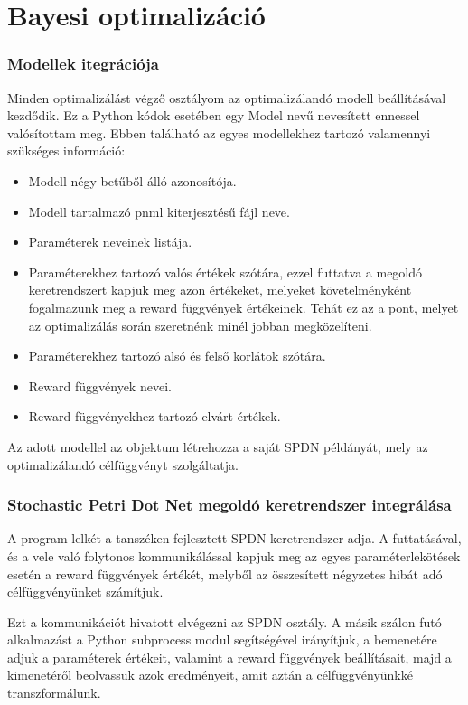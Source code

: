 \section{Bayesi optimalizáció}

\subsubsection{Modellek itegrációja}
Minden optimalizálást végző osztályom az optimalizálandó modell beállításával kezdődik. Ez a Python kódok esetében egy Model nevű nevesített ennessel valósítottam meg. %
Ebben található az egyes modellekhez tartozó valamennyi szükséges információ:
\begin{itemize}
	\item Modell négy betűből álló azonosítója.
	\item Modell tartalmazó pnml kiterjesztésű fájl neve.
	\item Paraméterek neveinek listája.
	\item Paraméterekhez tartozó valós értékek szótára, ezzel futtatva a megoldó keretrendszert kapjuk meg azon értékeket, melyeket követelményként fogalmazunk meg a reward függvények értékeinek. Tehát ez az a pont, melyet az optimalizálás során szeretnénk minél jobban megközelíteni.
	\item Paraméterekhez tartozó alsó és felső korlátok szótára.
	\item Reward függvények nevei.
	\item Reward függvényekhez tartozó elvárt értékek.
\end{itemize}

Az adott modellel az objektum létrehozza a saját SPDN példányát, mely az optimalizálandó célfüggvényt szolgáltatja.

\subsubsection{Stochastic Petri Dot Net megoldó keretrendszer integrálása}
A program lelkét a tanszéken fejlesztett SPDN keretrendszer adja. A futtatásával, és a vele való folytonos kommunikálással kapjuk meg az egyes paraméterlekötések esetén a reward függvények értékét, melyből az összesített négyzetes hibát adó célfüggvényünket számítjuk. 

Ezt a kommunikációt hivatott elvégezni az SPDN osztály. A másik szálon futó alkalmazást a Python subprocess modul segítségével irányítjuk, a bemenetére adjuk a paraméterek értékeit, valamint a reward függvények beállításait, majd a kimenetéről beolvassuk azok eredményeit, amit aztán a célfüggvényünkké transzformálunk.

